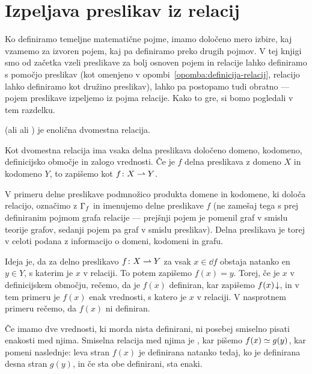 

        \section{Izpeljava preslikav iz relacij}\label{razdelek:izpeljava-preslikav-iz-relacij}

                Ko definiramo temeljne matematične pojme, imamo določeno mero izbire, kaj vzamemo za izvoren pojem, kaj pa definiramo preko drugih pojmov. V tej knjigi smo od začetka vzeli preslikave za bolj osnoven pojem in relacije lahko definiramo s pomočjo preslikav (kot omenjeno v opombi~\ref{opomba:definicija-relacij}, relacijo lahko definiramo kot družino preslikav), lahko pa postopamo tudi obratno --- pojem preslikave izpeljemo iz pojma relacije. Kako to gre, si bomo pogledali v tem razdelku.

                \begin{definicija}
                         (ali  ali ) je enolična dvomestna relacija.
                \end{definicija}

                Kot dvomestna relacija ima vsaka delna preslikava določeno domeno, kodomeno, definicijsko območje in zalogo vrednosti. Če je $f$ delna preslikava z domeno $X$ in kodomeno $Y$, to zapišemo kot $f\colon X \mathrel{\rightharpoonup} Y$.

                V primeru delne preslikave podmnožico produkta domene in kodomene, ki določa relacijo, označimo z $\Gamma_{f}$ in imenujemo  delne preslikave $f$ (ne zamešaj tega s prej definiranim pojmom grafa relacije --- prejšnji pojem je pomenil graf v smislu teorije grafov, sedanji pojem pa graf v smislu preslikav). Delna preslikava je torej v celoti podana z informacijo o domeni, kodomeni in grafu.

                Ideja je, da za delno preslikavo $f\colon X \mathrel{\rightharpoonup} Y$ za vsak $x \in \dd{f}$ obstaja natanko en $y \in Y$, s katerim je $x$ v relaciji. To potem zapišemo $f(x) = y$. Torej, če je $x$ v definicijskem območju, rečemo, da je $f(x)$ definiran, kar zapišemo ${f(x)}\!\downarrow$, in v tem primeru je $f(x)$ enak vrednosti, s katero je $x$ v relaciji. V nasprotnem primeru rečemo, da $f(x)$ ni definiran.

                Če imamo dve vrednosti, ki morda nista definirani, ni posebej smiselno pisati enakosti med njima. Smiselna relacija med njima je , kar pišemo $f(x) \simeq g(y)$, kar pomeni naslednje: leva stran $f(x)$ je definirana natanko tedaj, ko je definirana desna stran $g(y)$, in če sta obe definirani, sta enaki.

